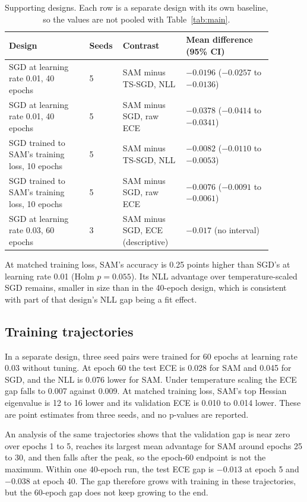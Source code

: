 \documentclass[11pt,letterpaper]{article}
\begin{document}
\begin{table}[!htbp]
  \centering
  \caption{Supporting designs. Each row is a separate design with its own baseline, so the values are not pooled with Table~\ref{tab:main}.}
  \label{tab:supp}
  \footnotesize\raggedright
  \begin{tabular}{p{0.28\linewidth}p{0.08\linewidth}p{0.22\linewidth}p{0.30\linewidth}}
    \toprule
    Design & Seeds & Contrast & Mean difference (95\% CI) \\
    \midrule
    SGD at learning rate 0.01, 40 epochs & 5 & SAM minus TS-SGD, NLL & $-0.0196$ ($-0.0257$ to $-0.0136$) \\
    SGD at learning rate 0.01, 40 epochs & 5 & SAM minus SGD, raw ECE & $-0.0378$ ($-0.0414$ to $-0.0341$) \\
    SGD trained to SAM's training loss, 10 epochs & 5 & SAM minus TS-SGD, NLL & $-0.0082$ ($-0.0110$ to $-0.0053$) \\
    SGD trained to SAM's training loss, 10 epochs & 5 & SAM minus SGD, raw ECE & $-0.0076$ ($-0.0091$ to $-0.0061$) \\
    SGD at learning rate 0.03, 60 epochs & 3 & SAM minus SGD, ECE (descriptive) & $-0.017$ (no interval) \\
    \bottomrule
  \end{tabular}
\end{table}

At matched training loss, SAM's accuracy is 0.25 points higher than SGD's at learning rate 0.01 (Holm $p = 0.055$). Its NLL advantage over temperature-scaled SGD remains, smaller in size than in the 40-epoch design, which is consistent with part of that design's NLL gap being a fit effect.

\subsection{Training trajectories}\label{sec:traj}
In a separate design, three seed pairs were trained for 60 epochs at learning rate 0.03 without tuning. At epoch 60 the test ECE is 0.028 for SAM and 0.045 for SGD, and the NLL is 0.076 lower for SAM. Under temperature scaling the ECE gap falls to 0.007 against 0.009. At matched training loss, SAM's top Hessian eigenvalue is 12 to 16 lower and its validation ECE is 0.010 to 0.014 lower. These are point estimates from three seeds, and no p-values are reported.

An analysis of the same trajectories shows that the validation gap is near zero over epochs 1 to 5, reaches its largest mean advantage for SAM around epochs 25 to 30, and then falls after the peak, so the epoch-60 endpoint is not the maximum. Within one 40-epoch run, the test ECE gap is $-0.013$ at epoch 5 and $-0.038$ at epoch 40. The gap therefore grows with training in these trajectories, but the 60-epoch gap does not keep growing to the end.
\end{document}
